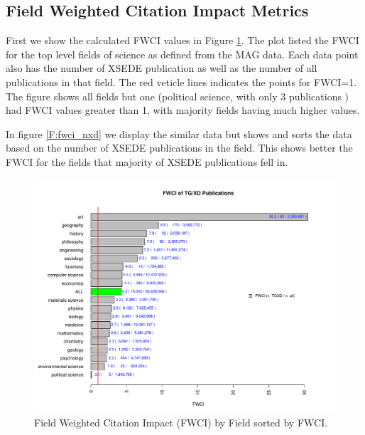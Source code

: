 \documentclass{sig-alternate}
\begin{document}
\subsection{Field Weighted Citation Impact Metrics}

First we show the calculated FWCI values in Figure \ref{F:fwci_fwci}. The plot
listed the FWCI for the top level fields of science as defined from the MAG data.
Each data point also has the number of XSEDE publication as well as the number of
all publications in that field. The red veticle lines indicates the points for
FWCI=1. The figure shows all fields but one (political science, with only 3 publications
) had FWCI values greater than 1, with majority fields having much higher values.

In figure \ref{F:fwci_nxd} we display the similar data but shows and sorts the data
based on the number of XSEDE publications in the field. This shows better the FWCI
for the fields that majority of XSEDE publications fell in.

\begin{figure}[htb!]
    \includegraphics[width=0.95\columnwidth]{images/fwci_fwci.pdf}
    \caption{Field Weighted Citation Impact (FWCI) by Field sorted by FWCI.}
    \label{F:fwci_fwci}
\end{figure}
\end{document}
